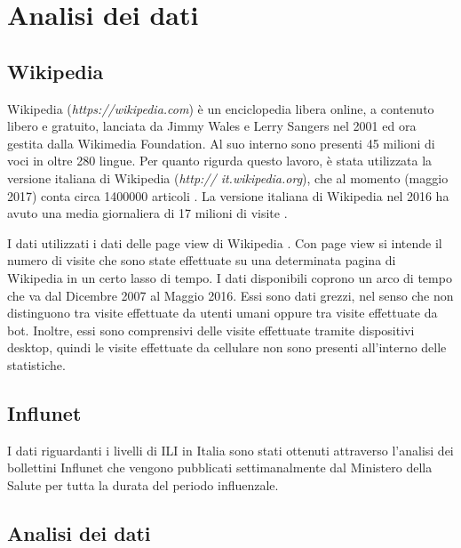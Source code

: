 \chapter{Analisi dei dati}

\section{Wikipedia}

Wikipedia (\textit{https://wikipedia.com}) è un enciclopedia libera online, a contenuto libero e gratuito, lanciata da Jimmy 
Wales e Lerry Sangers nel 2001 ed ora gestita dalla Wikimedia Foundation. Al suo interno sono presenti 45 milioni di voci in 
oltre 280 lingue. Per quanto rigurda questo lavoro, è stata utilizzata la versione italiana di Wikipedia (\textit{http://
it.wikipedia.org}), che al momento (maggio 2017) conta circa 1400000 articoli \cite{wikipedia_stats}. La versione italiana
di Wikipedia nel 2016 ha avuto una media giornaliera di 17 milioni di visite \cite{it_wikipedia_views_2016}.

I dati utilizzati i dati delle page view di Wikipedia \cite{wikipedia_pageviews}. Con page view si intende il numero di visite 
che sono state effettuate su una determinata pagina di Wikipedia in un certo lasso di tempo. I dati disponibili coprono un arco 
di tempo che va dal Dicembre 2007 al Maggio 2016. Essi sono dati grezzi, nel senso che non distinguono tra visite effettuate da 
utenti umani oppure tra visite effettuate da bot. Inoltre, essi sono comprensivi delle visite effettuate tramite dispositivi 
desktop, quindi le visite effettuate da cellulare non sono presenti all'interno delle statistiche.   

\section{Influnet}

I dati riguardanti i livelli di ILI in Italia sono stati ottenuti attraverso l'analisi dei bollettini Influnet
che vengono pubblicati settimanalmente dal Ministero della Salute per tutta la durata del periodo influenzale. 

\section{Analisi dei dati}